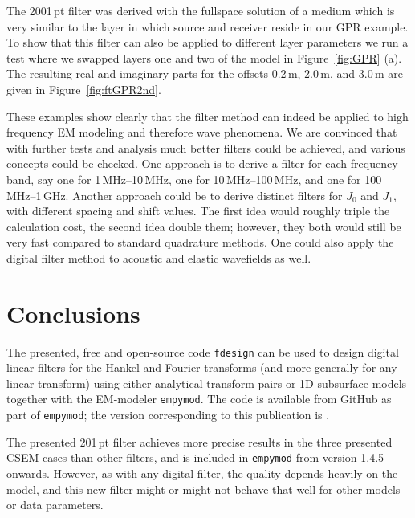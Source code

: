 \documentclass[paper,twocolumn,twoside]{geophysics}
\begin{document}
The 2001\,pt filter was derived with the fullspace solution of a medium which
is very similar to the layer in which source and receiver reside in our GPR
example. To show that this filter can also be applied to different layer
parameters we run a test where we swapped layers one and two of the model in
Figure~\ref{fig:GPR} (a). The resulting real and imaginary parts for the
offsets 0.2\,m, 2.0\,m, and 3.0\,m are given in Figure~\ref{fig:ftGPR2nd}.
%
%

These examples show clearly that the filter method can indeed be applied to
high frequency EM modeling and therefore wave phenomena. We are convinced that
with further tests and analysis much better filters could be achieved, and
various concepts could be checked. One approach is to derive a filter for each
frequency band, say one for 1\,MHz--10\,MHz, one for 10\,MHz--100\,MHz, and one
for 100\,MHz--1\,GHz. Another approach could be to derive distinct filters for
$J_0$ and $J_1$, with different spacing and shift values. The first idea would
roughly triple the calculation cost, the second idea double them; however, they
both would still be very fast compared to standard quadrature methods. One
could also apply the digital filter method to acoustic and elastic wavefields
as well.

\section{Conclusions}

The presented, free and open-source code \texttt{fdesign} can be used to design
digital linear filters for the Hankel and Fourier transforms (and more
generally for any linear transform) using either analytical transform pairs or
1D subsurface models together with the EM-modeler \texttt{empymod}. The code is
available from GitHub as part of \texttt{empymod}; the version corresponding to
this publication is \texttt{}.

The presented 201\,pt filter achieves more precise results in the three
presented CSEM cases than other filters, and is included in \texttt{empymod}
from version 1.4.5 onwards. However, as with any digital filter, the quality
depends heavily on the model, and this new filter might or might not behave
that well for other models or data parameters.
\end{document}
